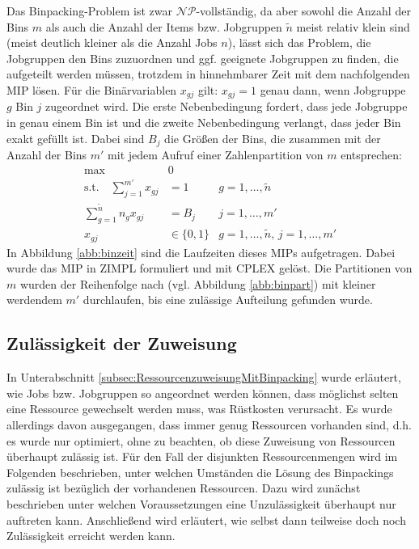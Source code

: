 \documentclass{scrreprt}
\begin{document}
Das Binpacking-Problem ist zwar $\mathcal{NP}$-vollständig, da aber sowohl die Anzahl der Bins $m$ 
als auch die Anzahl der Items bzw. Jobgruppen $\tilde{n}$ meist relativ klein sind (meist deutlich kleiner als die Anzahl Jobs $n$),
lässt sich das Problem, die Jobgruppen den Bins zuzuordnen und ggf. geeignete Jobgruppen zu finden, die aufgeteilt werden müssen, 
trotzdem in hinnehmbarer Zeit mit dem nachfolgenden MIP lösen. 
Für die Binärvariablen $x_{gj}$ gilt: $x_{gj}=1$ genau dann, wenn Jobgruppe $g$ Bin $j$ zugeordnet wird.
Die erste Nebenbedingung fordert, dass jede Jobgruppe in genau einem Bin ist 
und die zweite Nebenbedingung verlangt, dass jeder Bin exakt gefüllt ist.
Dabei sind $B_j$ die Größen der Bins, die zusammen mit der Anzahl der Bins $m'$ mit jedem Aufruf einer Zahlenpartition von $m$ entsprechen:
\begin{align}
    \text{max} \quad &0 \\
    \text{s.t.}\quad \sum_{j=1}^{m'} x_{gj} &= 1 &g=1,\ldots,\tilde{n}\\
    \sum_{g=1}^{\tilde{n}} n_g x_{gj} &= B_j &j=1,\ldots,m' \\
    x_{gj} &\in \{0,1\} &g=1,\ldots,\tilde{n}, \, j=1,\ldots,m'
\end{align}
In Abbildung \ref{abb:binzeit} sind die Laufzeiten dieses MIPs aufgetragen.
Dabei wurde das MIP in ZIMPL formuliert und mit CPLEX gelöst.
Die Partitionen von $m$ wurden der Reihenfolge nach (vgl. Abbildung \ref{abb:binpart}) mit kleiner werdendem $m'$ durchlaufen,
bis eine zulässige Aufteilung gefunden wurde.


\subsection{Zulässigkeit der Zuweisung}
\label{subsec:ZulaessigkeitDerZuweisung}
In Unterabschnitt \ref{subsec:RessourcenzuweisungMitBinpacking} wurde erläutert, wie Jobs bzw. Jobgruppen so angeordnet werden können,
dass möglichst selten eine Ressource gewechselt werden muss, was Rüstkosten verursacht.
Es wurde allerdings davon ausgegangen, dass immer genug Ressourcen vorhanden sind,
d.h. es wurde nur optimiert, ohne zu beachten, ob diese Zuweisung von Ressourcen überhaupt zulässig ist.
Für den Fall der disjunkten Ressourcenmengen wird im Folgenden beschrieben, unter welchen Umständen die Lösung des Binpackings zulässig ist
bezüglich der vorhandenen Ressourcen.
Dazu wird zunächst beschrieben unter welchen Voraussetzungen eine Unzulässigkeit überhaupt nur auftreten kann.
Anschließend wird erläutert, wie selbst dann teilweise doch noch Zulässigkeit erreicht werden kann.
\end{document}
